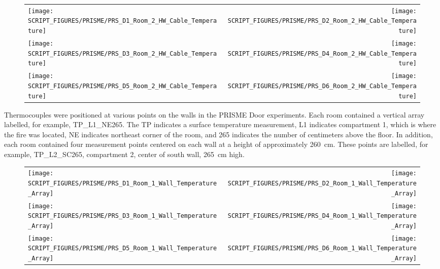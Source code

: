 \begin{figure}[p]
\begin{tabular*}{\textwidth}{l@{\extracolsep{\fill}}r}
\texttt{[image: SCRIPT\_FIGURES/PRISME/PRS\_D1\_Room\_2\_HW\_Cable\_Temperature]} &
\texttt{[image: SCRIPT\_FIGURES/PRISME/PRS\_D2\_Room\_2\_HW\_Cable\_Temperature]} \\
\texttt{[image: SCRIPT\_FIGURES/PRISME/PRS\_D3\_Room\_2\_HW\_Cable\_Temperature]} &
\texttt{[image: SCRIPT\_FIGURES/PRISME/PRS\_D4\_Room\_2\_HW\_Cable\_Temperature]} \\
\texttt{[image: SCRIPT\_FIGURES/PRISME/PRS\_D5\_Room\_2\_HW\_Cable\_Temperature]} &
\texttt{[image: SCRIPT\_FIGURES/PRISME/PRS\_D6\_Room\_2\_HW\_Cable\_Temperature]}
\end{tabular*}
\label{PRISME_HW_Cable_Room_2}
\end{figure}

\clearpage

Thermocouples were positioned at various points on the walls in the PRISME Door experiments. Each room contained a vertical array labelled, for example, TP\_L1\_NE265. The TP indicates a surface temperature measurement, L1 indicates compartment 1, which is where the fire was located, NE indicates northeast corner of the room, and 265 indicates the number of centimeters above the floor. In addition, each room contained four measurement points centered on each wall at a height of approximately 260~cm. These points are labelled, for example, TP\_L2\_SC265, compartment 2, center of south wall, 265~cm high.

\begin{figure}[!ht]
\begin{tabular*}{\textwidth}{l@{\extracolsep{\fill}}r}
\texttt{[image: SCRIPT\_FIGURES/PRISME/PRS\_D1\_Room\_1\_Wall\_Temperature\_Array]} &
\texttt{[image: SCRIPT\_FIGURES/PRISME/PRS\_D2\_Room\_1\_Wall\_Temperature\_Array]} \\
\texttt{[image: SCRIPT\_FIGURES/PRISME/PRS\_D3\_Room\_1\_Wall\_Temperature\_Array]} &
\texttt{[image: SCRIPT\_FIGURES/PRISME/PRS\_D4\_Room\_1\_Wall\_Temperature\_Array]} \\
\texttt{[image: SCRIPT\_FIGURES/PRISME/PRS\_D5\_Room\_1\_Wall\_Temperature\_Array]} &
\texttt{[image: SCRIPT\_FIGURES/PRISME/PRS\_D6\_Room\_1\_Wall\_Temperature\_Array]}
\end{tabular*}
\label{PRISME_Wall_Array_Room_1}
\end{figure}

